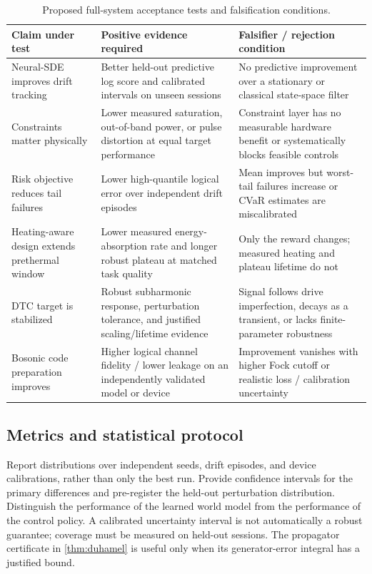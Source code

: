 \documentclass[10pt,twoside]{article}
\begin{document}
\begin{table}[t]
\centering\small
\caption{Proposed full-system acceptance tests and falsification conditions.}
\label{tab:falsification}
\begin{tabularx}{\textwidth}{p{}XX}
\toprule
Claim under test & Positive evidence required & Falsifier / rejection condition \\
\midrule
Neural-SDE improves drift tracking & Better held-out predictive log score and calibrated intervals on unseen sessions & No predictive improvement over a stationary or classical state-space filter \\
Constraints matter physically & Lower measured saturation, out-of-band power, or pulse distortion at equal target performance & Constraint layer has no measurable hardware benefit or systematically blocks feasible controls \\
Risk objective reduces tail failures & Lower high-quantile logical error over independent drift episodes & Mean improves but worst-tail failures increase or CVaR estimates are miscalibrated \\
Heating-aware design extends prethermal window & Lower measured energy-absorption rate and longer robust plateau at matched task quality & Only the reward changes; measured heating and plateau lifetime do not \\
DTC target is stabilized & Robust subharmonic response, perturbation tolerance, and justified scaling/lifetime evidence & Signal follows drive imperfection, decays as a transient, or lacks finite-parameter robustness \\
Bosonic code preparation improves & Higher logical channel fidelity / lower leakage on an independently validated model or device & Improvement vanishes with higher Fock cutoff or realistic loss / calibration uncertainty \\
\bottomrule
\end{tabularx}
\end{table}

\subsection{Metrics and statistical protocol}

Report distributions over independent seeds, drift episodes, and device calibrations, rather than only the best run. Provide confidence intervals for the primary differences and pre-register the held-out perturbation distribution. Distinguish the performance of the learned world model from the performance of the control policy. A calibrated uncertainty interval is not automatically a robust guarantee; coverage must be measured on held-out sessions. The propagator certificate in \cref{thm:duhamel} is useful only when its generator-error integral has a justified bound.
\end{document}
